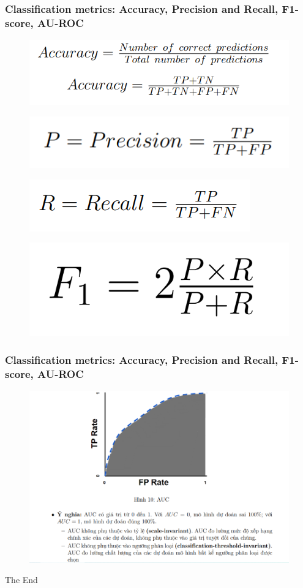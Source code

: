 \documentclass{beamer}
\begin{document}
\begin{frame}
\frametitle{Classification metrics: Accuracy, Precision and Recall, F1-score, AU-ROC}
\begin{figure}
    \centering
    \includegraphics[width=0.6\linewidth]{acc.png}
    
    
\end{figure}
\begin{figure}
    \centering
    \includegraphics[width=0.5\linewidth]{p.png}
    
    
\end{figure}
\begin{figure}
    \centering
    \includegraphics[width=0.5\linewidth]{r.png}

\end{figure}

\begin{figure}
    \centering
    \includegraphics[width=0.35\linewidth]{f1.png}
    
    
\end{figure}

\end{frame}



\begin{frame}
\frametitle{Classification metrics: Accuracy, Precision and Recall, F1-score, AU-ROC}

\begin{figure}
        \centering
        \includegraphics[width=0.75\linewidth]{auc.png}
        
        
    \end{figure}
\end{frame}




\begin{frame}
\Huge{\centerline{The End}}
\end{frame}

\end{document}
